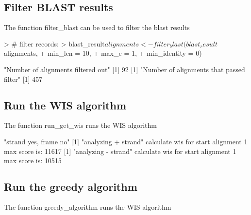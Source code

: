 \documentclass[letterpaper]{article}
\begin{document}
\subsection{Filter BLAST results}

The function filter\_blast can be used to filter the blast results
\begin{Schunk}
	\begin{Sinput}
		> # filter records:
		> blast_result$alignments <- filter_blast(blast_result$alignments,
		+                                         min_len = 10,
		+                                         max_e = 1,
		+                                         min_identity = 0)
	\end{Sinput}
	\begin{Soutput}
		[1] "Number of alignments filtered out"
		[1] 92
		[1] "Number of alignments that passed filter"
		[1] 457
	\end{Soutput}
\end{Schunk}


\subsection{Run the WIS algorithm}
The function run\_get\_wis runs the WIS algorithm

\begin{Schunk}
	\begin{Soutput}
		[1] "strand yes, frame no"
		[1] "analyzing + strand"
		calculate wis for start alignment  1 
		max score is:  11617 
		[1] "analyzing - strand"
		calculate wis for start alignment  1 
		max score is:  10515 
	\end{Soutput}
\end{Schunk}



\subsection{Run the greedy algorithm}
The function greedy\_algorithm runs the WIS algorithm
\end{document}
